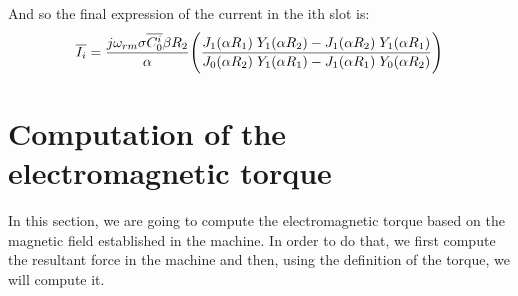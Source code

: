 And so the final expression of the current in the ith slot is:
\begin{equation*}
\overline{I_i} = \frac{j \omega_{rm} \sigma \overline{C_0^i} \beta R_2}{\alpha}   \Bigg( \frac{J_1(\alpha R_1)\hspace{1mm}Y_1(\alpha R_2) - J_1(\alpha R_2)\hspace{1mm}Y_1(\alpha R_1)} {J_0(\alpha R_2)\hspace{1mm}Y_1(\alpha R_1) - J_1(\alpha R_1)\hspace{1mm}Y_0(\alpha R_2)} \Bigg)  
\end{equation*}


\section{Computation of the electromagnetic torque}
In this section, we are going to compute the electromagnetic torque based on the magnetic field established in the machine. In order to do that, we first compute the resultant force in the machine and then, using the definition of the torque, we will compute it.

